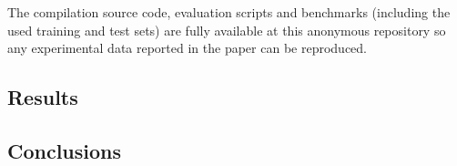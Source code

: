 \documentclass[letterpaper]{article} %
\begin{document}
The compilation source code, evaluation scripts and benchmarks (including the used training and test sets) are fully available at this anonymous repository {\em } so any experimental data reported in the paper can be reproduced.

\subsection{Results}

\subsection{Conclusions}
\label{sec:conclussions}





\end{document}
